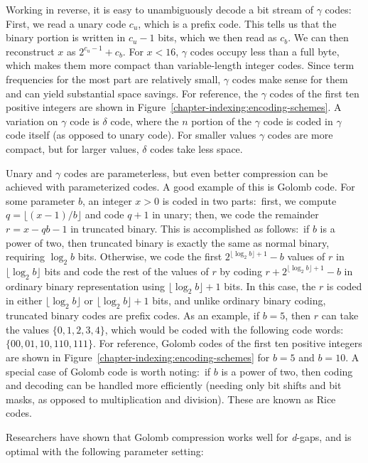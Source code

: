 Working in reverse, it is easy to unambiguously decode a bit stream of
$\gamma$ codes: First, we read a unary code $c_u$, which is a prefix
code.  This tells us that the binary portion is written in $c_u-1$
bits, which we then read as $c_b$.  We can then reconstruct $x$ as
$2^{c_u-1} + c_b$.  For $x<16$, $\gamma$ codes occupy less than a full
byte, which makes them more compact than variable-length integer
codes.  Since term frequencies for the most part are relatively small,
$\gamma$ codes make sense for them and can yield substantial space
savings.  For reference, the $\gamma$ codes of the first ten positive
integers are shown in Figure~\ref{chapter-indexing:encoding-schemes}.
A variation on $\gamma$ code is $\delta$ code, where the $n$ portion
of the $\gamma$ code is coded in $\gamma$ code itself (as opposed to
unary code).  For smaller values $\gamma$ codes are more compact, but
for larger values, $\delta$ codes take less space.

Unary and $\gamma$ codes are parameterless, but even better
compression can be achieved with parameterized codes.  A good example
of this is Golomb code.  For some parameter $b$, an integer $x>0$ is
coded in two parts:\ first, we compute $q = \lfloor (x-1)/b \rfloor$
and code $q+1$ in unary; then, we code the remainder $r = x - qb -1$
in truncated binary.  This is accomplished as follows:\ if $b$ is a
power of two, then truncated binary is exactly the same as normal
binary, requiring $\log_2 b$ bits.  Otherwise, we code the first
$2^{\lfloor \log_2 b \rfloor+1} - b$ values of $r$ in $\lfloor \log_2
b \rfloor$ bits and code the rest of the values of $r$ by coding
$r+2^{\lfloor \log_2 b \rfloor+1} - b$ in ordinary binary
representation using $\lfloor \log_2 b \rfloor+1$ bits.  In this case,
the $r$ is coded in either $\lfloor \log_2 b \rfloor$ or $\lfloor
\log_2 b \rfloor +1$ bits, and unlike ordinary binary coding,
truncated binary codes are prefix codes.  As an example, if $b=5$,
then $r$ can take the values $\{0, 1, 2, 3, 4\}$, which would be coded
with the following code words: $\{00,01,10,110,111\}$.  For reference,
Golomb codes of the first ten positive integers are shown in
Figure~\ref{chapter-indexing:encoding-schemes} for $b=5$ and $b=10$.
A special case of Golomb code is worth noting:\ if $b$ is a power of
two, then coding and decoding can be handled more efficiently (needing
only bit shifts and bit masks, as opposed to multiplication and
division).  These are known as Rice codes.

Researchers have shown that Golomb compression works well for \emph{
  d}-gaps, and is optimal with the following parameter setting:


